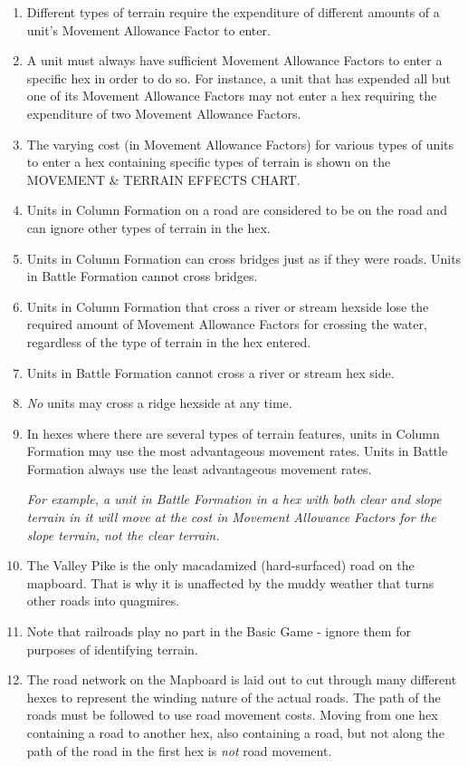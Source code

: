 \begin{enumerate}
  \item Different types of terrain require the expenditure of different amounts of a unit's Movement Allowance Factor to enter.

  \item A unit must always have sufficient Movement Allowance Factors to enter a specific hex in order to do so. For instance, a unit that has expended all but one of its Movement Allowance Factors may not enter a hex requiring the expenditure of two Movement Allowance Factors.

  \item The varying cost (in Movement Allowance Factors) for various types of units to enter a hex containing specific types of terrain is shown on the MOVEMENT \& TERRAIN EFFECTS CHART.

  \item Units in Column Formation on a road are considered to be on the road and can ignore other types of terrain in the hex.

  \item Units in Column Formation can cross bridges just as if they were roads. Units in Battle Formation cannot cross bridges.

  \item Units in Column Formation that cross a river or stream hexside lose the required amount of Movement Allowance Factors for crossing the water, regardless of the type of terrain in the hex entered.

  \item Units in Battle Formation cannot cross a river or stream hex side.

  \item \textit{No} units may cross a ridge hexside at any time.

  \item In hexes where there are several types of terrain features, units in Column Formation may use the most advantageous movement rates. Units in Battle Formation always use the least advantageous movement rates.

    \textit{For example, a unit in Battle Formation in a hex with both clear and slope terrain in it will move at the cost in Movement Allowance Factors for the slope terrain, not the clear terrain.}

  \item The Valley Pike is the only macadamized (hard-surfaced) road on the mapboard. That is why it is unaffected by the muddy weather that turns other roads into quagmires.

  \item Note that railroads play no part in the Basic Game - ignore them for purposes of identifying terrain.

  \item The road network on the Mapboard is laid out to cut through many different hexes to represent the winding nature of the actual roads. The path of the roads must be followed to use road movement costs. Moving from one hex containing a road to another hex, also containing a road, but not along the path of the road in the first hex is \textit{not} road movement.
\end{enumerate}

